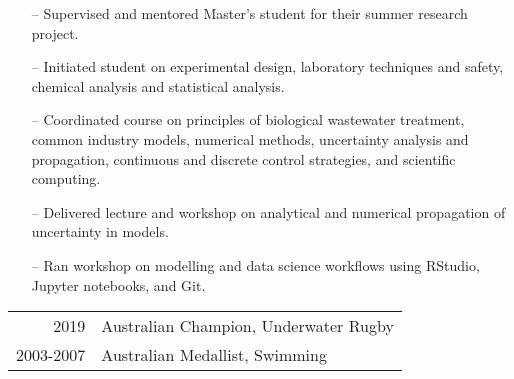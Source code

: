\documentclass[10.5pt,a4paper]{altacv}
\begin{document}
\begin{itemize}
    \setlength{\itemindent}{0.3em}
    \item[--]   \small{Supervised and mentored Master's student for their summer research project.}
    \item[--]   \small{Initiated student on experimental design, laboratory techniques and safety, chemical analysis and statistical analysis.}
\end{itemize}
\divider\smallskip

\begin{itemize}
    \setlength{\itemindent}{0.3em}
    \item[--]   \small{Coordinated course on principles of biological wastewater treatment, 
    common industry models, numerical methods, 
    uncertainty analysis and propagation, 
    continuous and discrete control strategies, 
    and scientific computing.}
\end{itemize}
\divider\smallskip

\begin{itemize}
    \setlength{\itemindent}{0.3em}
    \item[--]   \small{Delivered lecture and workshop on analytical 
    and numerical propagation of uncertainty in models.}
    \item[--]   \small{Ran workshop on modelling and data science 
    workflows using RStudio, Jupyter notebooks, and Git.}
\end{itemize}




\begin{tabular}{rl}
2019 & Australian Champion, Underwater Rugby \\
2003-2007 & Australian Medallist, Swimming\\
\end{tabular}







\end{document}
